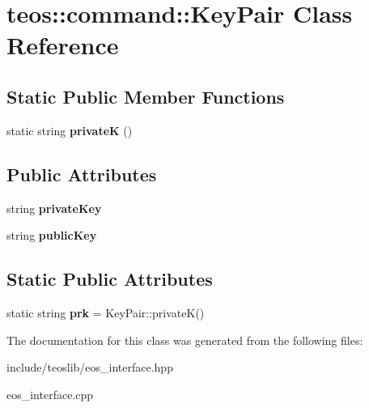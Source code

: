 \hypertarget{classteos_1_1command_1_1_key_pair}{}\section{teos\+:\+:command\+:\+:Key\+Pair Class Reference}
\label{classteos_1_1command_1_1_key_pair}
\subsection*{Static Public Member Functions}
\begin{DoxyCompactItemize}
\item 
\mbox{\label{classteos_1_1command_1_1_key_pair_a296e5566e03dd649860c3ef98e152682}} 
static string {\bfseries privateK} ()
\end{DoxyCompactItemize}
\subsection*{Public Attributes}
\begin{DoxyCompactItemize}
\item 
\mbox{\label{classteos_1_1command_1_1_key_pair_a6f255ea2d4ebc95b7af0da0ae9fb4618}} 
string {\bfseries private\+Key}
\item 
\mbox{\label{classteos_1_1command_1_1_key_pair_a642b4737875a24960d8acfd27f6bccc7}} 
string {\bfseries public\+Key}
\end{DoxyCompactItemize}
\subsection*{Static Public Attributes}
\begin{DoxyCompactItemize}
\item 
\mbox{\label{classteos_1_1command_1_1_key_pair_accd00dfb50854f396732befecdcf71d1}} 
static string {\bfseries prk} = Key\+Pair\+::privateK()
\end{DoxyCompactItemize}


The documentation for this class was generated from the following files\+:\begin{DoxyCompactItemize}
\item 
include/teoslib/eos\+\_\+interface.\+hpp\item 
eos\+\_\+interface.\+cpp\end{DoxyCompactItemize}
